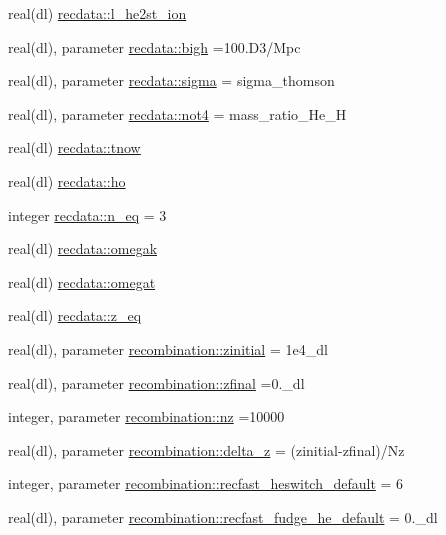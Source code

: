 \begin{DoxyCompactItemize}
\item 
real(dl) \mbox{\hyperlink{namespacerecdata_a19e8a17a31cb50954e10fa514602a043}{recdata\+::l\+\_\+he2st\+\_\+ion}}
\item 
real(dl), parameter \mbox{\hyperlink{namespacerecdata_a6d6695fdf7d29c72eb628457a9d2f8e8}{recdata\+::bigh}} =100.\+D3/\+Mpc
\item 
real(dl), parameter \mbox{\hyperlink{namespacerecdata_ad6030407673dc2717b2b8fb28662bd2e}{recdata\+::sigma}} = sigma\+\_\+thomson
\item 
real(dl), parameter \mbox{\hyperlink{namespacerecdata_affbfe58acc402b3952d720558fbd9344}{recdata\+::not4}} = mass\+\_\+ratio\+\_\+\+He\+\_\+H
\item 
real(dl) \mbox{\hyperlink{namespacerecdata_ab35ca0eb7ecb1758876e6e979df99bb9}{recdata\+::tnow}}
\item 
real(dl) \mbox{\hyperlink{namespacerecdata_a8f24dbf21d381a21986562167870de9b}{recdata\+::ho}}
\item 
integer \mbox{\hyperlink{namespacerecdata_a8ab5b420c3994ec0bbf10dd045a1c61d}{recdata\+::n\+\_\+eq}} = 3
\item 
real(dl) \mbox{\hyperlink{namespacerecdata_ad15940a7af68a80f1c36cd8e55395adf}{recdata\+::omegak}}
\item 
real(dl) \mbox{\hyperlink{namespacerecdata_a1b83b45446a75acd6c94310302246fd6}{recdata\+::omegat}}
\item 
real(dl) \mbox{\hyperlink{namespacerecdata_aba42d5992f637f77caa48a71505fc69d}{recdata\+::z\+\_\+eq}}
\item 
real(dl), parameter \mbox{\hyperlink{namespacerecombination_a59aa3ea34247a93b4f4c11b5ca93c97c}{recombination\+::zinitial}} = 1e4\+\_\+dl
\item 
real(dl), parameter \mbox{\hyperlink{namespacerecombination_a6c83801bcb6009615d1c1103da95f91f}{recombination\+::zfinal}} =0.\+\_\+dl
\item 
integer, parameter \mbox{\hyperlink{namespacerecombination_a2ebf98b22953bfe18fb372dd8e330d3e}{recombination\+::nz}} =10000
\item 
real(dl), parameter \mbox{\hyperlink{namespacerecombination_a7f3dac9960d3b472a93e5cf800eb1538}{recombination\+::delta\+\_\+z}} = (zinitial-\/zfinal)/Nz
\item 
integer, parameter \mbox{\hyperlink{namespacerecombination_a517d5a67e1e61e62f788768cb427edd2}{recombination\+::recfast\+\_\+heswitch\+\_\+default}} = 6
\item 
real(dl), parameter \mbox{\hyperlink{namespacerecombination_ae732fad2453ab4c2e0a7ba4c6e5cca43}{recombination\+::recfast\+\_\+fudge\+\_\+he\+\_\+default}} = 0.\+\_\+dl

\end{DoxyCompactItemize}
